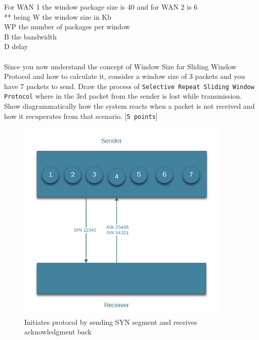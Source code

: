 \documentclass{WeSTassignment}
\begin{document}
For WAN 1 the window package size is 40 and for WAN 2 is 6\\

** being W the window size in Kb\\ WP the number of packages per window\\ B the bandwidth\\ D delay\\\\
Since you now understand the concept of Window Size for Sliding Window Protocol and how to calculate it, consider a window size of 3 packets and you have 7 packets to send. Draw the process of \texttt{Selective Repeat Sliding Window Protocol} where in the 3rd packet from the sender is lost while transmission. Show diagrammatically how the system reacts when a packet is not received and how it recuperates from that scenario. [\texttt{5 points}] \\


\begin{figure}[h]
  	\centering
  	\includegraphics[width=0.9\textwidth]{swp1.png}
   	\caption{Initiates protocol by sending SYN segment and receives acknowledgment back}
     \label{fig:step1}
\end{figure}
\end{document}
